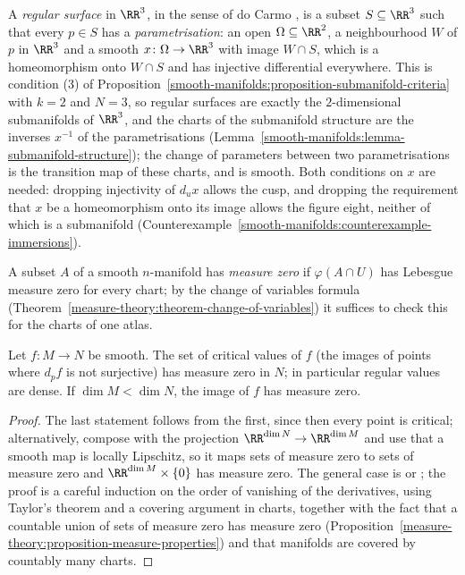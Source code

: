 \begin{remark}\label{smooth-manifolds:remark-do-carmo}
A \emph{regular surface} in $\RR^3$, in the sense of do Carmo \cite[Section 2.2]{do-carmo-curves-surfaces}, is a subset $S \subseteq \RR^3$ such that every
$p \in S$ has a \emph{parametrisation}: an open $\Omega \subseteq \RR^2$, a neighbourhood $W$ of $p$ in $\RR^3$ and a smooth $x \colon \Omega \to \RR^3$ with
image $W \cap S$, which is a homeomorphism onto $W \cap S$ and has injective differential everywhere. This is condition (3) of
Proposition~\ref{smooth-manifolds:proposition-submanifold-criteria} with $k = 2$ and $N = 3$, so regular surfaces are exactly the $2$-dimensional submanifolds
of $\RR^3$, and the charts of the submanifold structure are the inverses $x^{-1}$ of the parametrisations (Lemma~\ref{smooth-manifolds:lemma-submanifold-structure});
the change of parameters between two parametrisations is the transition map of these charts, and is smooth. Both conditions on $x$ are needed: dropping
injectivity of $d_ux$ allows the cusp, and dropping the requirement that $x$ be a homeomorphism onto its image allows the figure eight, neither of which is a
submanifold (Counterexample~\ref{smooth-manifolds:counterexample-immersions}).
\end{remark}

\begin{definition}\label{smooth-manifolds:definition-measure-zero}
A subset $A$ of a smooth $n$-manifold has \emph{measure zero} if $\varphi(A \cap U)$ has Lebesgue measure zero for every chart; by the change of variables formula
(Theorem~\ref{measure-theory:theorem-change-of-variables}) it suffices to check this for the charts of one atlas.
\end{definition}

\begin{theorem}[Sard]\label{smooth-manifolds:theorem-sard}
Let $f \colon M \to N$ be smooth. The set of critical values of $f$ (the images of points where $d_pf$ is not surjective) has measure zero in $N$; in particular regular values are dense. If
$\dim M < \dim N$, the image of $f$ has measure zero.
\end{theorem}

\begin{proof}
The last statement follows from the first, since then every point is critical; alternatively, compose with the projection $\RR^{\dim N} \to \RR^{\dim M}$ and use that a smooth map is locally Lipschitz, so
it maps sets of measure zero to sets of measure zero and $\RR^{\dim M} \times \{0\}$ has measure zero. The general case is \cite[Chapter 2]{milnor-differential-viewpoint} or
\cite[Chapter 6]{lee-smooth-manifolds}; the proof is a careful induction on the order of vanishing of the derivatives, using Taylor's theorem and a covering argument in charts, together with the fact that a
countable union of sets of measure zero has measure zero (Proposition~\ref{measure-theory:proposition-measure-properties}) and that manifolds are covered by countably many charts.
\end{proof}

